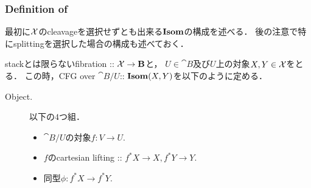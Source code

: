 \subsubsection{Definition of }
最初に$\mathcal{X}$のcleavageを選択せずとも出来る$\mathbf{Isom}$の構成を述べる．
後の注意で特にsplittingを選択した場合の構成も述べておく．
\begin{Def}[$\Isom(X, Y)$]
    stackとは限らないfibration :: $\mathcal{X} \to \mathbf{B}$と，
    $U \in \cat{B}$及び$U$上の対象$X, Y \in \mathcal{X}$をとる．
    この時，CFG over $\cat{B}/U$:: $\Isom(X, Y)$を以下のように定める．
    \begin{description}
        \item[Object.]
            以下の$4$つ組．
            \begin{itemize}
                \item $\cat{B}/U$の対象$f \colon V \to U$.
                \item $f$のcartesian lifting :: $f^*X \to X, f^*Y \to Y$.
                \item 同型$\phi \colon f^*X \to f^*Y$.
            \end{itemize}


\end{description}
\end{Def}
